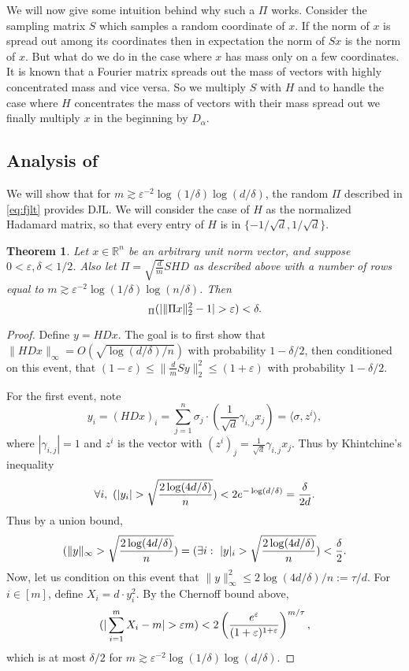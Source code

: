 \documentclass[11pt]{article}
\let\Pr\relax
\DeclareMathOperator*{\Pr}{\mathbb{P}}
\newcommand{\eps}{\varepsilon}
\newcommand{\inprod}[1]{\langle #1 \rangle}
\newcommand{\R}{\mathbb{R}}
\newtheorem{theorem}{Theorem}
\newcommand{\TheoremName}[1]{\label{thm:#1}}
\newcommand{\Eqsub}[1]{\eqref{eq:#1}}
\begin{document}
We will now give some intuition behind why such a $\Pi$ works. Consider the sampling matrix $S$ which samples a random coordinate of $x$. If the norm of $x$ is spread out among its coordinates then in expectation the norm of $Sx$ is the norm of $x$. But what do we do in the case where $x$ has mass only on a few coordinates. It is known that a Fourier matrix spreads out the mass of vectors with highly concentrated mass and vice versa. So we multiply $S$ with $H$ and to handle the case where $H$ concentrates the mass of vectors with their mass spread out we finally multiply $x$ in the beginning by $D_\alpha$.

\subsection{Analysis of \cite{AilonC09}}

We will show that for $m\gtrsim \eps^{-2}\log(1/\delta)\log(d/\delta)$, the random $\Pi$ described in \Eqsub{fjlt} provides DJL.  We will consider the case of $H$ as the normalized Hadamard matrix, so that every entry of $H$ is in $\{-1/\sqrt d, 1/\sqrt d\}$.

\begin{theorem}\TheoremName{fjlt}
	Let $x\in\R^n$ be an arbitrary unit norm vector, and suppose $0 < \eps, \delta < 1/2$. Also let $\Pi = \sqrt{\frac dm} S H D$ as described above with a number of rows equal to $m\gtrsim \eps^{-2}\log(1/\delta)\log(n/\delta)$. Then
	$$
	\Pr_\Pi(| \|\Pi x\|_2^2 - 1 | > \eps ) < \delta .
	$$
\end{theorem}
\begin{proof}
	Define $y = HDx$. The goal is to first show that $\|HDx\|_\infty = O(\sqrt{\log(d/\delta)/ n})$ with probability $1-\delta/2$, then conditioned on this event, that $(1-\eps) \le \|\frac dm S y\|_2^2\le (1+\eps)$ with probability $1-\delta/2$.
	
	For the first event, note 
	$$
	y_i = (HDx)_i = \sum_{j=1}^n \sigma_j\cdot (\frac 1{\sqrt d}\gamma_{i,j} x_j) = \inprod{\sigma, z^i}  ,
	$$
	where $|\gamma_{i,j}| = 1$ and $z^i$ is the vector with $(z^i)_j = \frac 1{\sqrt d}\gamma_{i,j} x_j$. Thus by Khintchine's inequality
	$$
	\forall i,\ \Pr(|y_i| > \sqrt{\frac{2\log(4d/\delta)}n}) < 2 e^{-\log(d/\delta)} = \frac{\delta}{2d} .
	$$
	Thus by a union bound,
	$$
	\Pr(\|y\|_\infty > \sqrt{\frac{2\log(4d/\delta)}n}) = \Pr(\exists i:\ |y|_i > \sqrt{\frac{2\log(4d/\delta)}n}) < \frac{\delta}2 .
	$$
	Now, let us condition on this event that $\|y\|_\infty^2 \le 2\log(4d/\delta)/n := \tau/d$. For $i\in [m]$, define $X_i = d\cdot y_i^2$. By the Chernoff bound above,
	$$
	\Pr(|\sum_{i=1}^m X_i - m| > \eps m) < 2 \left(\frac{e^\eps}{(1+\eps)^{1+\eps}}\right)^{m/\tau} ,
	$$
	which is at most $\delta/2$ for $m\gtrsim \eps^{-2}\log(1/\delta)\log(d/\delta)$.
\end{proof}
\end{document}
